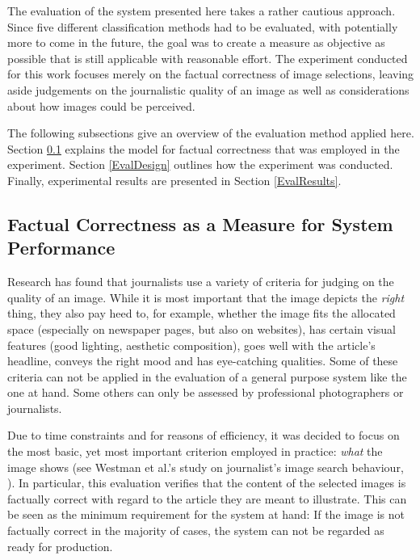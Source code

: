 \documentclass[11pt,a4paper,twoside]{article}
\begin{document}
The evaluation of the system presented here takes a rather cautious approach. Since five different classification methods had to be evaluated, with potentially more to come in the future, the goal was to create a measure as objective as possible that is still applicable with reasonable effort. The experiment conducted for this work focuses merely on the factual correctness of image selections, leaving aside judgements on the journalistic quality of an image as well as considerations about how images could be perceived.

The following subsections give an overview of the evaluation method applied here. Section \ref{EvalFacts} explains the model for factual correctness that was employed in the experiment. Section \ref{EvalDesign} outlines how the experiment was conducted. Finally, experimental results are presented in Section \ref{EvalResults}.

\subsection{Factual Correctness as a Measure for System Performance} \label{EvalFacts}

Research has found that journalists use a variety of criteria for judging on the quality of an image. While it is most important that the image depicts the \emph{right} thing, they also pay heed to, for example, whether the image fits the allocated space (especially on newspaper pages, but also on websites), has certain visual features (good lighting, aesthetic composition), goes well with the article's headline, conveys the right mood and has eye-catching qualities. \cite[p. 108]{Westman2006ImageContext} Some of these criteria can not be applied in the evaluation of a general purpose system like the one at hand. Some others can only be assessed by professional photographers or journalists.

Due to time constraints and for reasons of efficiency, it was decided to focus on the most basic, yet most important criterion employed in practice: \emph{what} the image shows (see Westman et al.'s study on journalist's image search behaviour, \cite{Westman2006ImageContext}). In particular, this evaluation verifies that the content of the selected images is factually correct with regard to the article they are meant to illustrate. This can be seen as the minimum requirement for the system at hand: If the image is not factually correct in the majority of cases, the system can not be regarded as ready for production.
\end{document}
